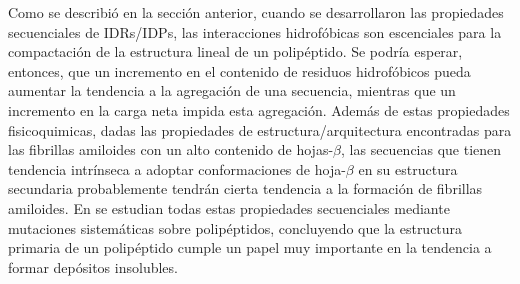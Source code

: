 Como se describió en la sección anterior, cuando se desarrollaron las propiedades secuenciales de IDRs/IDPs, las interacciones hidrofóbicas son escenciales para la compactación de la estructura lineal de un polipéptido.
Se podría esperar, entonces, que un incremento en el contenido de residuos hidrofóbicos pueda aumentar la tendencia a la agregación de una secuencia, mientras que un incremento en la carga neta impida esta agregación. 
Además de estas propiedades fisicoquimicas, dadas las propiedades de estructura/arquitectura encontradas para las fibrillas amiloides con un alto contenido de hojas-$\beta$,
las secuencias que tienen tendencia intrínseca a adoptar conformaciones de hoja-$\beta$ en su estructura secundaria probablemente tendrán cierta tendencia a la formación de fibrillas amiloides.  
En \cite{chiti2003rationalization} se estudian todas estas propiedades secuenciales mediante mutaciones sistemáticas sobre polipéptidos, concluyendo 
que la estructura primaria de un polipéptido cumple un papel muy importante en la tendencia a formar depósitos insolubles.



